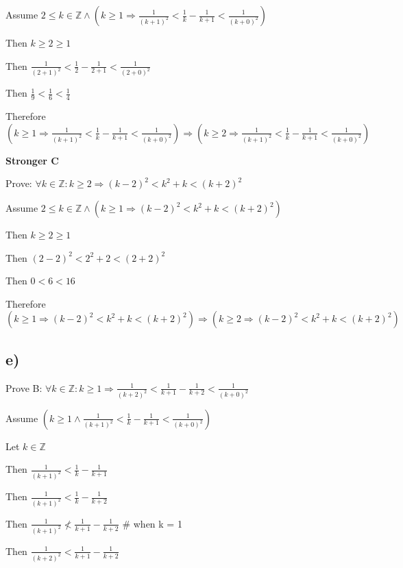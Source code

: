 \documentclass[11pt, oneside]{article}   	%
\begin{document}
Assume $ 2 \leq k \in \mathbb{Z} \land ( k \geq 1 \Rightarrow \frac{1}{(k+1)^2} <  \frac{1}{k} - \frac{1}{k+1} < \frac{1}{(k+0)^2} ) $

\indent \indent Then $ k \geq 2 \geq 1$

\indent \indent Then $ \frac{1}{(2+1)^2} <  \frac{1}{2} - \frac{1}{2+1} < \frac{1}{(2+0)^2} $

\indent \indent Then $ \frac{1}{9} <  \frac{1}{6} < \frac{1}{4} $

\indent \indent Therefore $ ( k \geq 1 \Rightarrow \frac{1}{(k+1)^2} <  \frac{1}{k} - \frac{1}{k+1} < \frac{1}{(k+0)^2} ) \Rightarrow (  k \geq 2 \Rightarrow \frac{1}{(k+1)^2} <  \frac{1}{k} - \frac{1}{k+1} < \frac{1}{(k+0)^2} ) $



\noindent \textbf{Stronger C}

Prove: $\forall k \in \mathbb{Z} : k \geq 2 \Rightarrow (k-2)^2 <  k^2 + k < (k+2)^2$

Assume $ 2 \leq k \in \mathbb{Z} \land ( k \geq 1 \Rightarrow (k-2)^2 <  k^2 + k < (k+2)^2) $ 

\indent \indent Then $ k \geq 2 \geq 1$

\indent \indent Then $ (2-2)^2 <  2^2 + 2 < (2+2)^2 $

\indent \indent Then $ 0 <  6 < 16 $

\indent \indent Therefore $ ( k \geq 1 \Rightarrow (k-2)^2 <  k^2 + k < (k+2)^2) \Rightarrow (  k \geq 2 \Rightarrow (k-2)^2 <  k^2 + k < (k+2)^2 ) $




\subsection{e)}

\noindent Prove B: $\forall k \in \mathbb{Z} : k \geq 1 \Rightarrow \frac{1}{(k+2)^2} <  \frac{1}{k+1} - \frac{1}{k+2} < \frac{1}{(k+0)^2}$

Assume $ ( k \geq 1 \land \frac{1}{(k+1)^2} <  \frac{1}{k} - \frac{1}{k+1} < \frac{1}{(k+0)^2} ) $

Let $k \in \mathbb{Z}$

\indent \indent Then $\frac{1}{(k+1)^2} <  \frac{1}{k} - \frac{1}{k+1} $

\indent \indent Then $\frac{1}{(k+1)^2} <  \frac{1}{k} - \frac{1}{k+2} $

\indent \indent Then $\frac{1}{(k+1)^2} \not<  \frac{1}{k+1} - \frac{1}{k+2} $
\# when k = 1

\indent \indent Then $\frac{1}{(k+2)^2} <  \frac{1}{k+1} - \frac{1}{k+2} $
\end{document}
